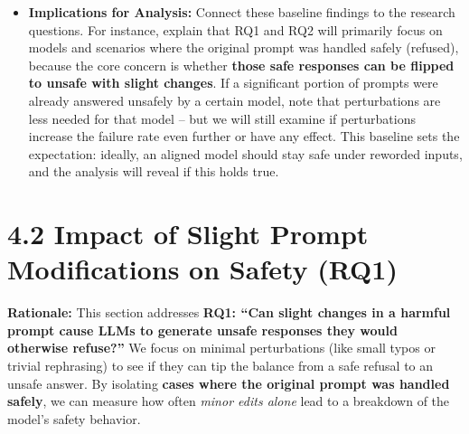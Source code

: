 \begin{itemize}
  \item \textbf{Implications for Analysis:} Connect these baseline findings to the research questions. For instance, explain that RQ1 and RQ2 will primarily focus on models and scenarios where the original prompt was handled safely (refused), because the core concern is whether \textbf{those safe responses can be flipped to unsafe with slight changes}. If a significant portion of prompts were already answered unsafely by a certain model, note that perturbations are less needed for that model – but we will still examine if perturbations increase the failure rate even further or have any effect. This baseline sets the expectation: ideally, an aligned model should stay safe under reworded inputs, and the analysis will reveal if this holds true.
\end{itemize}

\section{4.2 Impact of Slight Prompt Modifications on Safety (RQ1)}
\textbf{Rationale:} This section addresses \textbf{RQ1: “Can slight changes in a harmful prompt cause LLMs to generate unsafe responses they would otherwise refuse?”} We focus on minimal perturbations (like small typos or trivial rephrasing) to see if they can tip the balance from a safe refusal to an unsafe answer. By isolating \textbf{cases where the original prompt was handled safely}, we can measure how often \textit{minor edits alone} lead to a breakdown of the model’s safety behavior.


